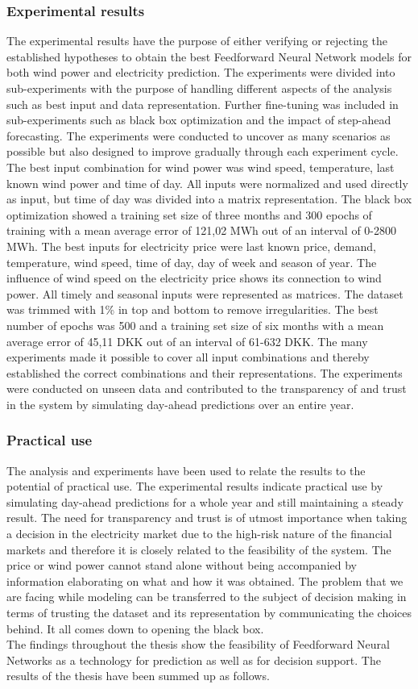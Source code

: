 \subsubsection{Experimental results}
The experimental results have the purpose of either verifying or rejecting the established hypotheses to obtain the best Feedforward Neural Network models for both wind power and electricity prediction. The experiments were divided into sub-experiments with the purpose of handling different aspects of the analysis such as best input and data representation. Further fine-tuning was included in sub-experiments such as black box optimization and the impact of step-ahead forecasting. The experiments were conducted to uncover as many scenarios as possible but also designed to improve gradually through each experiment cycle. The best input combination for wind power was wind speed, temperature, last known wind power and time of day. All inputs were normalized and used directly as input, but time of day was divided into a matrix representation. The black box optimization showed a training set size of three months and 300 epochs of training with a mean average error of 121,02 MWh out of an interval of 0-2800 MWh. The best inputs for electricity price were last known price, demand, temperature, wind speed, time of day, day of week and season of year. The influence of wind speed on the electricity price shows its connection to wind power. All timely and seasonal inputs were represented as matrices. The dataset was trimmed with 1\% in top and bottom to remove irregularities. The best number of epochs was 500 and a training set size of six months with a mean average error of 45,11 DKK out of an interval of 61-632 DKK. The many experiments made it possible to cover all input combinations and thereby established the correct combinations and their representations. The experiments were conducted on unseen data and contributed to the transparency of and trust in the system by simulating day-ahead predictions over an entire year.
\subsubsection{Practical use}
The analysis and experiments have been used to relate the results to the potential of practical use. The experimental results indicate practical use by simulating day-ahead predictions for a whole year and still maintaining a steady result. The need for transparency and trust is of utmost importance when taking a decision in the electricity market due to the high-risk nature of the financial markets and therefore it is closely related to the feasibility of the system. The price or wind power cannot stand alone without being accompanied by information elaborating on what and how it was obtained. The problem that we are facing while modeling can be transferred to the subject of decision making in terms of trusting the dataset and its representation by communicating the choices behind. It all comes down to opening the black box.
\\[1cm]
The findings throughout the thesis show the feasibility of Feedforward Neural Networks as a technology for prediction as well as for decision support. The results of the thesis have been summed up as follows.

